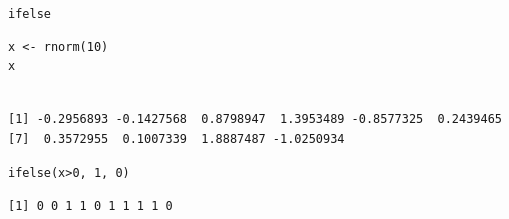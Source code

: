 \documentclass[aspectratio=169, usenames,svgnames,dvipsnames]{beamer}
\begin{document}
\begin{frame}[label={sec:org8ca5db8},fragile]{\texttt{ifelse}}
 \lstset{language=r,label= ,caption= ,captionpos=b,numbers=none}
\begin{lstlisting}
x <- rnorm(10)
x
\end{lstlisting}

\begin{verbatim}

[1] -0.2956893 -0.1427568  0.8798947  1.3953489 -0.8577325  0.2439465
[7]  0.3572955  0.1007339  1.8887487 -1.0250934
\end{verbatim}


\lstset{language=r,label= ,caption= ,captionpos=b,numbers=none}
\begin{lstlisting}
ifelse(x>0, 1, 0)
\end{lstlisting}

\begin{verbatim}
[1] 0 0 1 1 0 1 1 1 1 0
\end{verbatim}
\end{frame}
\end{document}
